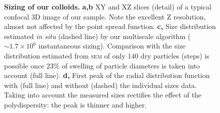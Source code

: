 \begin{figure}
	\caption{\textbf{Sizing of our colloids.} \textbf{a,b} XY and XZ slices (detail) of a typical confocal 3D image of our sample. Note the excellent Z resolution, almost not affected by the point spread function. \textbf{c,} Size distribution estimated \emph{in situ} (dashed line) by our multiscale algorithm ($\sim 1.7\times 10^6$ instantaneous sizing). Comparison with the size distribution estimated from \textsc{sem} of only $140$ dry particles (steps) is possible once $23\%$ of swelling of particle diameters is taken into account (full line). \textbf{d,} First peak of the radial distribution function with (full line) and without (dashed) the individual sizes data. Taking into account the measured sizes rectifies the effect of the polydispersity: the peak is thinner and higher.}
	\label{fig:sizing}
\end{figure}
\tikzset{external/force remake}
